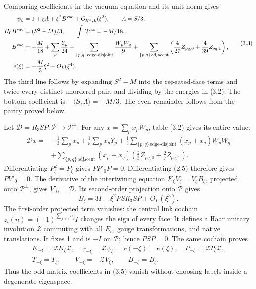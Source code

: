 \documentclass[
  11pt,
]{article}
\begin{document}
Comparing coefficients in the vacuum equation and its unit norm gives \[
\begin{split}
 \psi_\xi&=1+\xi A+\xi^2 B^{\rm vac}+O_{H^k,L}(\xi^3),
   \qquad A=S/3,\\
 H_0B^{\rm vac}&=(S^2-M)/3,
   \qquad \int B^{\rm vac}=-M/18,\\
 B^{\rm vac}&=-\frac M{18}+\sum_p\frac{Y_p}{24}
 +\sum_{\{p,q\}\,\text{edge-disjoint}}\frac{W_pW_q}{9}
 +\sum_{\{p,q\}\,\text{adjacent}}
       \left(\frac4{27}Z_{pq,0}+\frac4{39}Z_{pq,1}\right),\\
 e(\xi)&=-\frac M3\xi^2+O_L(\xi^4).
\end{split}
\tag{3.3}
\] The third line follows by expanding \(S^2-M\) into the repeated-face
terms and twice every distinct unordered pair, and dividing by the
energies in (3.2). The bottom coefficient is
\(-\langle S,A\rangle=-M/3\). The even remainder follows from the parity
proved below.

Let \(\mathscr D=R_3SP:\mathcal P\to\mathcal P^\perp\). For any
\(x=\sum_px_pW_p\), table (3.2) gives its entire value: \[
\begin{split}
 \mathscr D x={}&-\frac13\sum_px_p
 +\frac15\sum_px_pY_p
 +\frac13\sum_{\{p,q\}\,\text{edge-disjoint}}(x_p+x_q)W_pW_q\\
 &+\sum_{\{p,q\}\,\text{adjacent}}(x_p+x_q)
           \left(\frac23Z_{pq,0}+\frac27Z_{pq,1}\right).
\end{split}
\tag{3.4}
\] Differentiating \(P_\xi^2=P_\xi\) gives \(PP'_0P=0\). Differentiating
(2.5) therefore gives \(PV'_0=0\). The derivative of the intertwining
equation \(K_\xi V_\xi=V_\xi B_\xi\), projected onto
\(\mathcal P^\perp\), gives \(V'_0=\mathscr D\). Its second-order
projection onto \(\mathcal P\) gives \[
 B_\xi=3I-\xi^2PSR_3SP+O_L(\xi^3).
\tag{3.5}
\] The first-order projected term vanishes: the central link cochain
\(z_i(n)=(-1)^{\sum_{j<i}n_j}I\) changes the sign of every face. It
defines a Haar unitary involution \(\mathcal Z\) commuting with all
\(E_e\), gauge transformations, and native translations. It fixes 1 and
is \(-I\) on \(\mathcal P\); hence \(PSP=0\). The same cochain proves \[
\begin{gathered}
 K_{-\xi}=\mathcal ZK_\xi\mathcal Z,\quad
 \psi_{-\xi}=\mathcal Z\psi_\xi,\quad e(-\xi)=e(\xi),\quad
 P_{-\xi}=\mathcal ZP_\xi\mathcal Z,\\
 T_{-\xi}=T_\xi,\qquad V_{-\xi}=-\mathcal ZV_\xi,
 \qquad B_{-\xi}=B_\xi.
\end{gathered}
\tag{3.6}
\] Thus the odd matrix coefficients in (3.5) vanish without choosing
labels inside a degenerate eigenspace.
\end{document}
